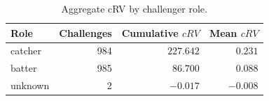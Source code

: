 \begin{table}[h]
\centering
\caption{Aggregate cRV by challenger role.}
\label{tab:challenger}
\small
\begin{tabular}{lrrr}
\toprule
Role & Challenges & Cumulative $cRV$ & Mean $cRV$ \\
\midrule
catcher & 984 & $227.642$ & $0.231$ \\
batter & 985 & $86.700$ & $0.088$ \\
unknown & 2 & $-0.017$ & $-0.008$ \\
\bottomrule
\end{tabular}
\end{table}
